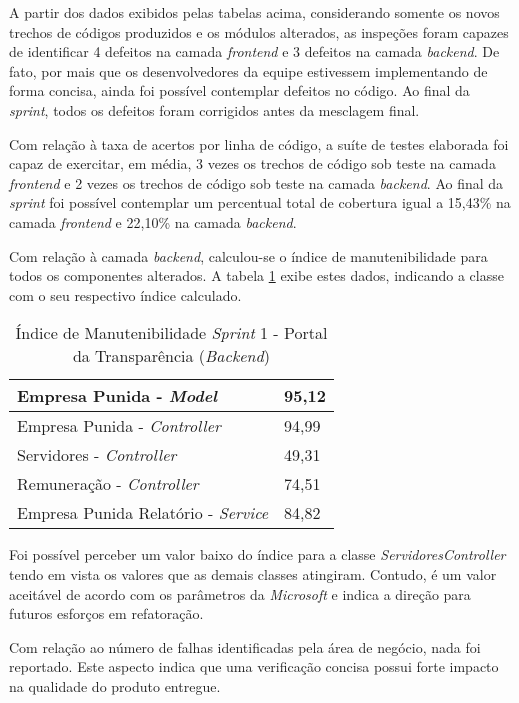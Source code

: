 A partir dos dados exibidos pelas tabelas acima, considerando somente os novos trechos de códigos produzidos e os módulos alterados, as inspeções foram capazes de identificar 4 defeitos na camada \textit{frontend} e 3 defeitos na camada \textit{backend}. De fato, por mais que os desenvolvedores da equipe estivessem implementando de forma concisa, ainda foi possível contemplar defeitos no código. Ao final da \textit{sprint}, todos os defeitos foram corrigidos antes da mesclagem final.

Com relação à taxa de acertos por linha de código, a suíte de testes elaborada foi capaz de exercitar, em média, 3 vezes os trechos de código sob teste na camada \textit{frontend} e 2 vezes os trechos de código sob teste na camada \textit{backend}. Ao final da \textit{sprint} foi possível contemplar um percentual total de cobertura igual a 15,43\% na camada \textit{frontend} e 22,10\% na camada \textit{backend}.

Com relação à camada \textit{backend}, calculou-se o índice de manutenibilidade para todos os componentes alterados. A tabela \ref{table:tabela4} exibe estes dados, indicando a classe com o seu respectivo índice calculado.

\begin{table}[h]
\centering
\begin{tabular}{ | m{10cm} | m{6cm} | } 
\hline
Empresa Punida - \textit{Model} & 95,12 \\ 
\hline
Empresa Punida - \textit{Controller} & 94,99 \\ 
\hline
Servidores - \textit{Controller} & 49,31 \\ 
\hline
Remuneração - \textit{Controller} & 74,51 \\ 
\hline
Empresa Punida Relatório - \textit{Service} & 84,82 \\
\hline
\end{tabular}
\caption{Índice de Manutenibilidade \textit{Sprint} 1 - Portal da Transparência (\textit{Backend})}
\label{table:tabela4}
\end{table}

Foi possível perceber um valor baixo do índice para a classe \textit{ServidoresController} tendo em vista os valores que as demais classes atingiram. Contudo, é um valor aceitável de acordo com os parâmetros da \textit{Microsoft} e indica a direção para futuros esforços em refatoração.

Com relação ao número de falhas identificadas pela área de negócio, nada foi reportado. Este aspecto indica que uma verificação concisa possui forte impacto na qualidade do produto entregue.

